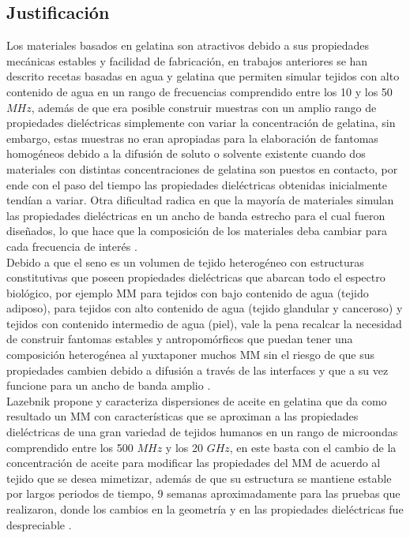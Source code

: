 \subsection{Justificación}

Los materiales basados en gelatina son atractivos debido a sus propiedades mecánicas estables y facilidad de fabricación, en trabajos anteriores se han descrito recetas basadas en agua y gelatina que permiten simular tejidos con alto contenido de agua en un rango de frecuencias comprendido entre los 10 y los 50 $MHz$, además de que era posible construir muestras con un amplio rango de propiedades dieléctricas simplemente con variar la concentración de gelatina, sin embargo, estas muestras no eran apropiadas para la elaboración de fantomas homogéneos debido a la difusión de soluto o solvente existente cuando dos materiales con distintas concentraciones de gelatina son puestos en contacto, por ende con el paso del tiempo las propiedades dieléctricas obtenidas inicialmente tendían a variar. Otra dificultad radica en que la mayoría de materiales simulan las propiedades dieléctricas en un ancho de banda estrecho para el cual fueron diseñados, lo que hace que la composición de los materiales deba cambiar para cada frecuencia de interés \cite{A019:lazebnik2005tissue}. \\ 

Debido a que el seno es un volumen de tejido heterogéneo con estructuras constitutivas que poseen propiedades dieléctricas que abarcan todo el espectro biológico, por ejemplo MM para tejidos con bajo contenido de agua (tejido adiposo), para tejidos con alto contenido de agua (tejido glandular y canceroso) y tejidos con contenido intermedio de agua (piel), vale la pena recalcar la necesidad de construir fantomas estables y antropomórficos que puedan tener una composición heterogénea al yuxtaponer muchos MM sin el riesgo de que sus propiedades cambien debido a difusión a través de las interfaces y que a su vez funcione para un ancho de banda amplio \cite{A019:lazebnik2005tissue}. \\ 

Lazebnik propone y caracteriza dispersiones de aceite en gelatina que da como resultado un MM con características que se aproximan a las propiedades dieléctricas de una gran variedad de tejidos humanos en un rango de microondas comprendido entre los 500 $MHz$ y los 20 $GHz$, en este basta con el cambio de la concentración de aceite para modificar las propiedades del MM de acuerdo al tejido que se desea mimetizar, además de que su estructura se mantiene estable por largos periodos de tiempo, 9 semanas aproximadamente para las pruebas que realizaron, donde los cambios en la geometría y en las propiedades dieléctricas fue despreciable \cite{A019:lazebnik2005tissue}. \\ 

